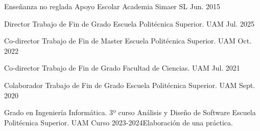 \begin{cventries}
    

  \cventry
    {Enseñanza no reglada} %
    {Apoyo Escolar} %
    {Academia Simaer SL} %
    {Jun. 2015} %
    {}

  \cventry
	{Director} %
	{Trabajo de Fin de Grado} %
	{Escuela Politécnica Superior. UAM} %
	{Jul. 2025} %
	{
		\begin{cvitems} %
				\item {}
		\end{cvitems}
	}

  \cventry
	{Co-director} %
	{Trabajo de Fin de Master} %
	{Escuela Politécnica Superior. UAM} %
	{Oct. 2022} %
	{
		\begin{cvitems} %
			\item {}
		\end{cvitems}
	}

  \cventry
	{Co-director} %
	{Trabajo de Fin de Grado} %
	{Facultad de Ciencias. UAM} %
	{Jul. 2021} %
	{
		\begin{cvitems} %
			\item {
			}
		\end{cvitems}
	}

   \cventry
	 {Colaborador} %
	 {Trabajo de Fin de Grado} %
	 {Escuela Politécnica Superior. UAM} %
	 {Sept. 2020} %
	 {
	 	\begin{cvitems} %
	 		\item {}
	 	\end{cvitems}
	 }

   \cventry 
   	{Grado en Ingeniería Informática. 3º curso}
	{Análisis y Diseño de Software} %
	{Escuela Politécnica Superior. UAM} %
	{Curso 2023-2024}{Elaboración de una práctica.}


\end{cventries}

